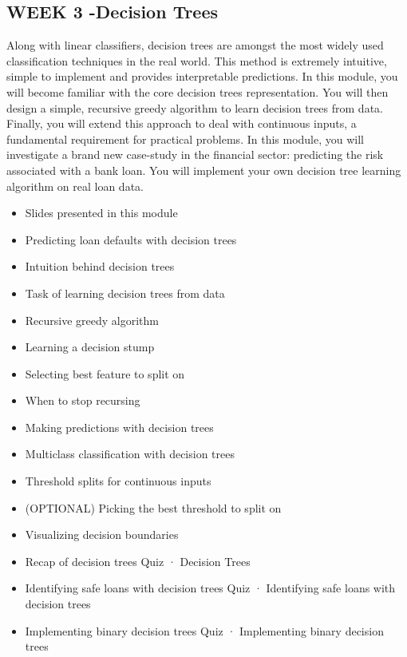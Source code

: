 \subsection{WEEK 3 -Decision Trees}
Along with linear classifiers, decision trees are amongst the most widely used classification techniques in the real world. This method is extremely intuitive, simple to implement and provides interpretable predictions. In this module, you will become familiar with the core decision trees representation. You will then design a simple, recursive greedy algorithm to learn decision trees from data. Finally, you will extend this approach to deal with continuous inputs, a fundamental requirement for practical problems. In this module, you will investigate a brand new case-study in the financial sector: predicting the risk associated with a bank loan. You will implement your own decision tree learning algorithm on real loan data.
\begin{itemize}
\item Slides presented in this module
\item Predicting loan defaults with decision trees
\item Intuition behind decision trees
\item Task of learning decision trees from data
\item Recursive greedy algorithm
\item Learning a decision stump
\item Selecting best feature to split on
\item When to stop recursing
\item Making predictions with decision trees
\item Multiclass classification with decision trees
\item Threshold splits for continuous inputs
\item (OPTIONAL) Picking the best threshold to split on
\item Visualizing decision boundaries
\item Recap of decision trees
Quiz · Decision Trees
\item Identifying safe loans with decision trees
Quiz · Identifying safe loans with decision trees
\item Implementing binary decision trees
Quiz · Implementing binary decision trees
\end{itemize}
\newpage
